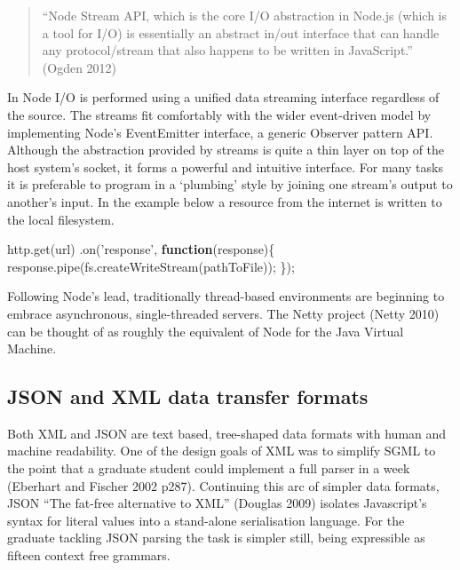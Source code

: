 \documentclass[12pt, ]{article}
\newenvironment{Shaded}{}{}
\newcommand{\KeywordTok}[1]{\textcolor[rgb]{0.00,0.44,0.13}{\textbf{{#1}}}}
\newcommand{\StringTok}[1]{\textcolor[rgb]{0.25,0.44,0.63}{{#1}}}
\newcommand{\OtherTok}[1]{\textcolor[rgb]{0.00,0.44,0.13}{{#1}}}
\newcommand{\FunctionTok}[1]{\textcolor[rgb]{0.02,0.16,0.49}{{#1}}}
\newcommand{\NormalTok}[1]{{#1}}
\begin{document}
\begin{quote}
``Node Stream API, which is the core I/O abstraction in Node.js (which
is a tool for I/O) is essentially an abstract in/out interface that can
handle any protocol/stream that also happens to be written in
JavaScript.'' (Ogden 2012)
\end{quote}

In Node I/O is performed using a unified data streaming interface
regardless of the source. The streams fit comfortably with the wider
event-driven model by implementing Node's EventEmitter interface, a
generic Observer pattern API. Although the abstraction provided by
streams is quite a thin layer on top of the host system's socket, it
forms a powerful and intuitive interface. For many tasks it is
preferable to program in a `plumbing' style by joining one stream's
output to another's input. In the example below a resource from the
internet is written to the local filesystem.

\begin{Shaded}
\begin{Highlighting}[]
\OtherTok{http}\NormalTok{.}\FunctionTok{get}\NormalTok{(url)}
   \NormalTok{.}\FunctionTok{on}\NormalTok{(}\StringTok{'response'}\NormalTok{, }\KeywordTok{function}\NormalTok{(response)\{}
      \OtherTok{response}\NormalTok{.}\FunctionTok{pipe}\NormalTok{(}\OtherTok{fs}\NormalTok{.}\FunctionTok{createWriteStream}\NormalTok{(pathToFile));}
   \NormalTok{\});}
\end{Highlighting}
\end{Shaded}

Following Node's lead, traditionally thread-based environments are
beginning to embrace asynchronous, single-threaded servers. The Netty
project (Netty 2010) can be thought of as roughly the equivalent of Node
for the Java Virtual Machine.

\subsection{JSON and XML data transfer formats}\label{jsonxml}

Both XML and JSON are text based, tree-shaped data formats with human
and machine readability. One of the design goals of XML was to simplify
SGML to the point that a graduate student could implement a full parser
in a week (Eberhart and Fischer 2002 p287). Continuing this arc of
simpler data formats, JSON ``The fat-free alternative to XML'' (Douglas
2009) isolates Javascript's syntax for literal values into a stand-alone
serialisation language. For the graduate tackling JSON parsing the task
is simpler still, being expressible as fifteen context free grammars.
\end{document}
